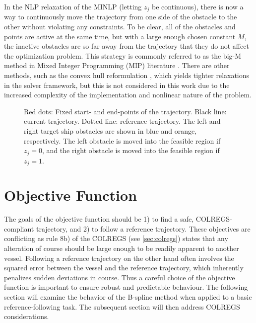 In the NLP relaxation of the MINLP (letting $z_j$ be continuous), there is now a way to continuously move the trajectory from one side of the obstacle to the other without violating any constraints. To be clear, all of the obstacles and points are active at the same time, but with a large enough chosen constant $M$, the inactive obstacles are so far away from the trajectory that they do not affect the optimization problem. This strategy is commonly referred to as the big-M method in Mixed Integer Programming (MIP) literature \citep{gan2012adaptive}. There are other methods, such as the convex hull reformulation \citep{sherali1994hierarchy}, which yields tighter relaxations in the solver framework, but this is not considered in this work due to the increased complexity of the implementation and nonlinear nature of the problem.

\begin{figure}
    \centering
    
    \caption{Red dots: Fixed start- and end-points of the trajectory. Black line: current trajectory. Dotted line: reference trajectory. The left and right target ship obstacles are shown in blue and orange, respectively. The left obstacle is moved into the feasible region if $z_j = 0$, and the right obstacle is moved into the feasible region if $z_j = 1$.}
    \label{fig:non-convex-obstacle-mi}
\end{figure}



\section{Objective Function}
The goals of the objective function should be 1) to find a safe, COLREGS-compliant trajectory, and 2) to follow a reference trajectory. These objectives are conflicting as rule 8b) of the COLREGS (see \cref{sec:colregs}) states that any alteration of course should be large enough to be readily apparent to another vessel. Following a reference trajectory on the other hand often involves the squared error between the vessel and the reference trajectory, which inherently penalizes sudden deviations in course. 
Thus a careful choice of the objective function is important to ensure robust and predictable behaviour. 
The following section will examine the behavior of the B-spline method when applied to a basic reference-following task. The subsequent section will then address COLREGS considerations.


